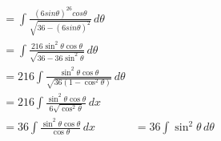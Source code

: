 \documentclass[preview]{standalone}
\begin{document}
\begin{align*}
&=\int \frac{(6sin\theta)^26cos\theta}{\sqrt{36-(6sin\theta)^2}} \, d\theta \\ &=\int \frac{216\sin^2\theta\cos\theta}{\sqrt{36-36\sin^2\theta}} \, d\theta \\&=216 \int \frac{\sin^2\theta\cos\theta}{\sqrt{36(1-\cos^2\theta)}} \, d\theta \\&=216 \int \frac{\sin^2\theta\cos\theta}{6\sqrt{\cos^2\theta}} \, dx \\&=36 \int \frac{\sin^2\theta\cos\theta}{\cos\theta} \, dx&=36 \int \sin^2\theta \, d\theta
\end{align*}
\end{document}
